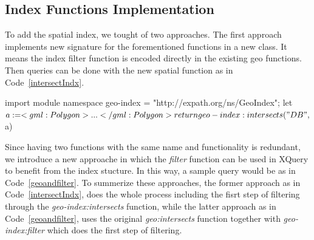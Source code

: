 \documentclass[a4paper,12pt]{article}
\begin{document}
\subsection{Index Functions Implementation}
\label{indexFunc}
To add the spatial index, we tought of two approaches. The first approach implements new signature for the forementioned functions in a new class. It means the index filter function is encoded directly in the existing geo functions. Then queries can be done with the new spatial function as in Code~\ref{intersectIndx}.
\vspace{10px}
\begin{fakeXML}[label=intersectIndx,caption=The geo function containing the idex functions]
import module namespace geo-index = "http://expath.org/ns/GeoIndex";
let $a:= <gml:Polygon> ... </gml:Polygon>
return geo-index:intersects("DB", $a) 
\end{fakeXML}

\vspace{10px}
\vspace{10px}

Since having two functions with the same name and functionality is redundant, we introduce a new approache in which the \textit{filter} function can be used in XQuery to benefit from the index stucture. In this way, a sample query would be as in Code~\ref{geoandfilter}. To summerize these approaches, the former approach as in Code~\ref{intersectIndx}, does the whole process including the fisrt step of filtering through the \textit{geo-index:intersects} function, while the latter approach as in Code~\ref{geoandfilter}, uses the original \textit{geo:intersects} function together with \textit{geo-index:filter} which does the first step of filtering. 
\end{document}
